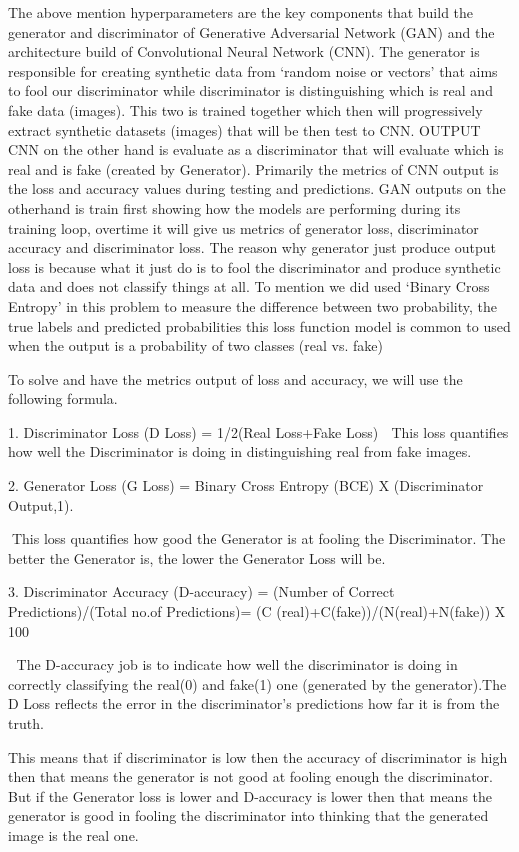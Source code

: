 \documentclass[12pt]{article}
\begin{document}
The above mention hyperparameters are the key components that build the generator and discriminator of Generative Adversarial Network (GAN) and the architecture build of Convolutional Neural Network (CNN). The generator is responsible for creating synthetic data from ‘random noise or vectors’ that aims to fool our discriminator while discriminator is distinguishing which is real and fake data (images). This two is trained together which then will progressively extract synthetic datasets (images) that will be then test to CNN. 
OUTPUT
CNN on the other hand is evaluate as a discriminator that will evaluate which is real and is fake (created by Generator).  Primarily the metrics of CNN output is the loss and accuracy values during testing and predictions. GAN outputs on the otherhand is train first showing how the models are performing during its training loop, overtime it will give us metrics of generator loss, discriminator accuracy and discriminator loss. The reason why generator just produce output loss is because what it just do is to fool the discriminator and produce synthetic data and does not classify things at all. To mention we did used ‘Binary Cross Entropy’ in this problem to measure the difference between two probability, the true labels and predicted probabilities this loss function model is common to used when the output is a probability of two classes (real vs. fake)

To solve and have the metrics output of loss and accuracy, we will use the following formula.

1. Discriminator Loss (D Loss) = 1/2(Real Loss+Fake Loss) 
 This loss quantifies how well the Discriminator is doing in distinguishing real from fake images.

2. Generator Loss (G Loss) = Binary Cross Entropy (BCE) X (Discriminator Output,1).

This loss quantifies how good the Generator is at fooling the Discriminator. The better the Generator is, the lower the Generator Loss will be.

3. Discriminator Accuracy (D-accuracy) = (Number of Correct Predictions)/(Total no.of Predictions)=  (C (real)+C(fake))/(N(real)+N(fake))  X 100

 The D-accuracy job is to indicate how well the discriminator is doing in correctly classifying the real(0) and fake(1) one (generated by the generator).The D Loss reflects the error in the discriminator's predictions how far it is from the truth.

This means that if discriminator is low then the accuracy of discriminator is high then that means the generator is not good at fooling enough the discriminator. But if the Generator loss is lower and D-accuracy is lower then that means the generator is good in fooling the discriminator into thinking that the generated image is the real one.
\end{document}
